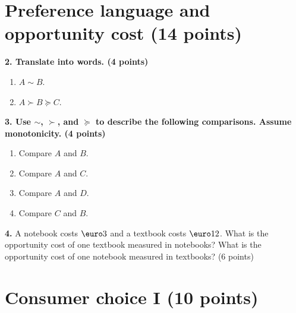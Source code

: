 \documentclass[11pt,a4paper]{article}
\begin{document}
\newpage
\section{Preference language and opportunity cost \hfill (14 points)}

\textbf{2. Translate into words. \hfill (4 points)}
\begin{enumerate}[label=\textbf{\alph*.}]
  \item \(A\sim B\).
  \item \(A\succ B\succeq C\).
\end{enumerate}

\vspace{0.3em}
\textbf{3. Use \(\sim\), \(\succ\), and \(\succeq\) to describe the
following comparisons. Assume monotonicity. \hfill (4 points)}

\begin{center}
\end{center}

\begin{enumerate}[label=\textbf{\alph*.}]
  \item Compare \(A\) and \(B\).
  \item Compare \(A\) and \(C\).
  \item Compare \(A\) and \(D\).
  \item Compare \(C\) and \(B\).
\end{enumerate}

\vspace{0.2em}
\textbf{4.} A notebook costs \(\text{\euro}3\) and a textbook costs
\(\text{\euro}12\). What is the opportunity cost of one textbook measured in
notebooks? What is the opportunity cost of one notebook measured in textbooks?
\hfill (6 points)

\vfill
\newpage
\section{Consumer choice I \hfill (10 points)}
\end{document}
